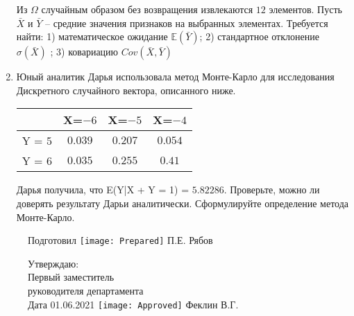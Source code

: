 \documentclass[a4paper,11pt]{article}
\begin{document}
\begin{enumerate}
Из $\Omega$ случайным образом без возвращения извлекаются $12$ элементов. 
Пусть $\bar X$ и $\bar Y$ – средние значения признаков на выбранных элементах. 
Требуется найти: 1) математическое ожидание $\mathbb{E}(\bar Y)$; 2) стандартное отклонение $\sigma(\bar X)$ ; 
3) ковариацию $Cov(\bar X, \bar Y)$


\item

    
    	Юный аналитик Дарья использовала метод Монте-Карло для исследования Дискретного случайного вектора, описанного ниже.

        \begin{tabular}{|c|c|c|c|}
	\hline
	& X=$-6$ & X=$-5$ & X=$-4$ \\
	\hline
	Y = $5$ & $0.039$ & $0.207$  &  $0.054$ \\
	\hline
	Y = $6$ & $0.035$ & $0.255$ & $0.41$  \\
	\hline
\end{tabular}

    	Дарья получила, что E(Y|X + Y = 1) = $5.82286$.
    	Проверьте, можно ли доверять результату Дарьи аналитически. Сформулируйте определение метода Монте-Карло.
    

\end{enumerate}

\begin{figure}[H]
	Подготовил
	\hfill
	\texttt{[image: Prepared]}
	П.Е. Рябов
\end{figure}


\begin{figure}[H]
	Утверждаю:\\
	Первый заместитель\\
	руководителя департамента\\
	Дата 01.06.2021
	\hfill
	\texttt{[image: Approved]}
	Феклин В.Г.
\end{figure}
\end{document}
